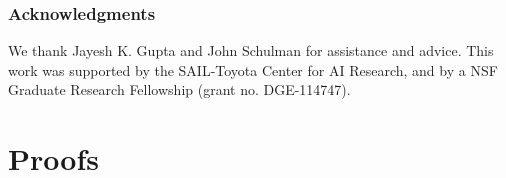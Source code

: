 \documentclass{article}
\newcommand{\1}{\mathbb{I}} %
\begin{document}
%




\subsubsection*{Acknowledgments}
We thank Jayesh K. Gupta and John Schulman for assistance and advice. This work was supported by the SAIL-Toyota Center for AI Research, and by a NSF Graduate Research Fellowship (grant no. DGE-114747).

{
\small
\setlength{\bibsep}{0pt plus 0.3ex}

}


\clearpage
\appendix
\section{Proofs} \label{sec:proofs}
\end{document}

